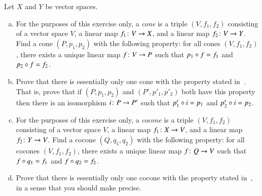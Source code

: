 \begin{iquestion}
Let $X$ and $Y$ be vector spaces.
%
\begin{enumerate}[(b)]
\item
\label{part:vs-prod}
For the purposes of this exercise only, a \emph{cone} is a triple $(V, f_1,
f_2)$ consisting of a vector space $V$, a linear map $f_1\from V \to X$, and
a linear map $f_2\from V \to Y$.  Find a cone $(P, p_1,
p_2)$ with the following property: for all cones $(V, f_1, f_2)$, there exists
a unique linear map $f\from V \to P$ such that $p_1 \mathbin{\circ} f = f_1$ and $p_2 \mathbin{\circ} f
= f_2$.

\item
Prove that there is essentially only one cone with the property stated
in~.  That is, prove that if $(P, p_1, p_2)$ and $(P',
p'_1, p'_2)$ both have this property then there is an isomorphism $i\from P
\to P'$ such that $p'_1 \mathbin{\circ} i = p_1$ and $p'_2 \mathbin{\circ} i = p_2$.

\item
\label{part:vs-coprod}
For the purposes of this exercise only, a \emph{cocone} is a triple $(V,
f_1, f_2)$ consisting of a vector space $V$, a linear map $f_1\from X \to
V$, and a linear map $f_2\from Y \to V$.  Find a cocone $(Q, q_1, q_2)$
with the following property: for all cocones $(V, f_1, f_2)$, there exists
a unique linear map $f\from Q \to V$ such that $f \mathbin{\circ} q_1 = f_1$ and $f \mathbin{\circ}
q_2 = f_2$.

\item
Prove that there is essentially only one cocone with the property stated
 in~, in a sense that you should make precise.
\end{enumerate}
\end{iquestion}
